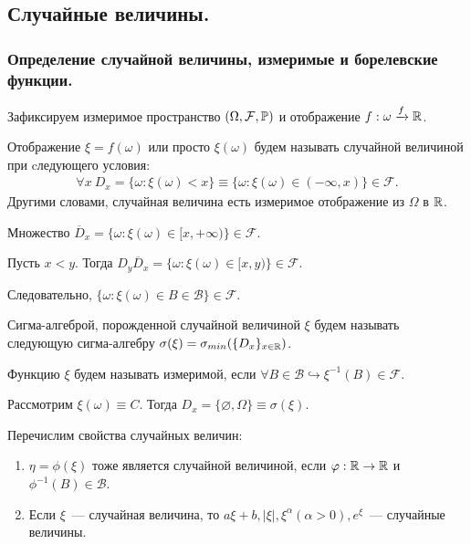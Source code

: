 \subsection{Случайные величины.}
\subsubsection{Определение случайной величины, измеримые и борелевские функции.}

Зафиксируем измеримое пространство $(\Omega, \mathcal{F}, \P)$ и отображение $f: \omega \xrightarrow{f}\R$.

\begin{definition}
    Отображение $\xi = f(\omega)$ или просто $\xi(\omega)$ будем называть случайной величиной при cледующего условия:
    \begin{gather*}
        \forall x \ D_x = \{\omega : \xi(\omega) < x \} \equiv \{ \omega : \xi(\omega) \in (-\infty, x) \} \in \mathcal{F}.
    \end{gather*}
    Другими словами, случайная величина есть измеримое отображение из $\Omega$ в $\R$.
\end{definition}
\begin{remark}
    Множество $\overline{D}_x = \{\omega : \xi(\omega) \in [x, + \infty) \} \in \mathcal{F}$.

    \noindent Пусть $x < y$. Тогда $D_y\overline{D}_x = \{\omega : \xi(\omega) \in [x, y) \} \in \mathcal{F}$.

    \noindent Следовательно, $\{\omega : \xi(\omega) \in B \in \mathcal{B} \} \in \mathcal{F}$.
\end{remark}
\begin{definition}
    Сигма-алгеброй, порожденной случайной величиной $\xi$ будем называть следующую сигма-алгебру $\sigma(\xi) = \sigma_{min}(\{D_x \}_{x \in \R})$.
\end{definition}

\begin{definition}
    Функцию $\xi$ будем называть измеримой, если $\forall B \in \mathcal{B} \hookrightarrow \xi^{-1}(B) \in \mathcal{F}$.
\end{definition}
\begin{example}
    Рассмотрим $\xi(\omega) \equiv C.$ Тогда $D_x = \{\varnothing, \Omega\} \equiv \sigma(\xi).$
\end{example}

\begin{property}
    Перечислим свойства случайных величин:
    \begin{enumerate}
        \item $\eta = \phi(\xi)$ тоже является случайной величиной, если $\phi : \R \rightarrow \R$ и $\phi^{-1}(B) \in \mathcal{B}$.
        \item Если $\xi$~--- случайная величина, то $a\xi + b, |\xi|, \xi^{\alpha} (\alpha > 0), e^{\xi}$~--- случайные величины. 
    \end{enumerate}
\end{property}
